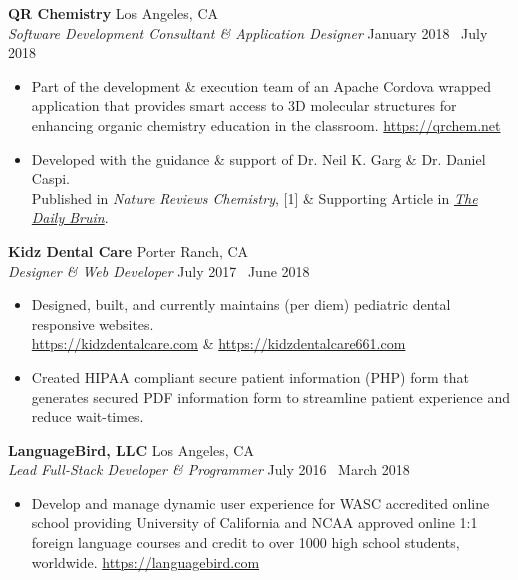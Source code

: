 \documentclass[margin]{res}
\begin{document}
\begin{resume}
		{\bf QR Chemistry} \hfill Los Angeles, CA \\
		{\it Software Development Consultant \& Application Designer} \hfill January 2018 \textendash\ July 2018
		\begin{itemize} \itemsep -2pt
			\item Part of the development \& execution team of an Apache Cordova wrapped application that provides smart access to 3D molecular structures for enhancing organic chemistry education in the classroom. \textcolor{RoyalBlue}{\url{https://qrchem.net}}
			\item Developed with the guidance \& support of Dr. Neil K. Garg \& Dr. Daniel Caspi. \\Published in {\it Nature Reviews Chemistry}, [1] \& Supporting Article in \textcolor{RoyalBlue}{\href{https://dailybruin.com/2018/07/30/student-developed-tool-brings-3d-molecular-models-to-smartphone-screen/}{\it The Daily Bruin}}.
		\end{itemize}
		
		{\bf Kidz Dental Care} \hfill Porter Ranch, CA \\
		{\it Designer \& Web Developer} \hfill July 2017 \textendash\ June 2018
		\begin{itemize} \itemsep -2pt
			\item Designed, built, and currently maintains (per diem) pediatric dental responsive websites. \\ \textcolor{RoyalBlue}{\url{https://kidzdentalcare.com}} \& \textcolor{RoyalBlue}{\url{https://kidzdentalcare661.com}}
			\item Created HIPAA compliant secure patient information (PHP) form that generates secured PDF information form to streamline patient experience and reduce wait-times.
		\end{itemize}
		\vspace{0.02cm} 
		{\bf LanguageBird\textsuperscript{\textregistered}, LLC} \hfill Los Angeles, CA \\
		{\it Lead Full-Stack Developer \& Programmer} \hfill July 2016 \textendash\ March 2018
		\begin{itemize} \itemsep -2pt
			\item Develop and manage dynamic user experience for WASC accredited online school providing University of California and NCAA approved online 1:1 foreign language courses and credit to over 1000 high school students, worldwide. \textcolor{RoyalBlue}{\url{https://languagebird.com}}
		\end{itemize}
		

\end{resume}
\end{document}
